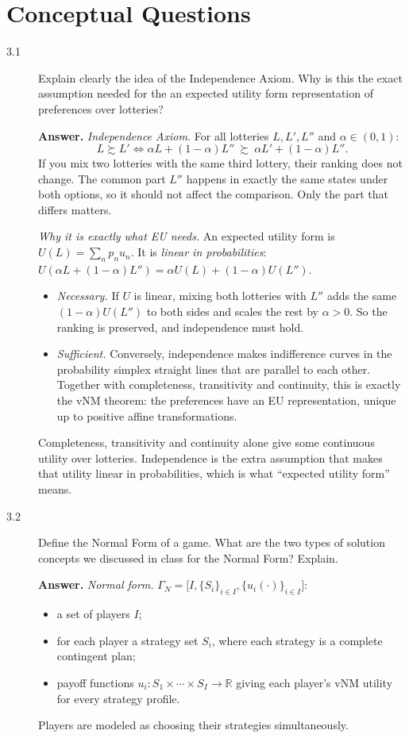 \documentclass[11pt]{article}
\newenvironment{solution}{\par\smallskip\noindent\textbf{Answer.} }{\par\medskip}
\begin{document}
\section{Conceptual Questions}

\begin{description}
\item[3.1] Explain clearly the idea of the Independence Axiom. Why is this the exact assumption needed for the an expected utility form representation of preferences over lotteries?
\begin{solution}
\emph{Independence Axiom.} For all lotteries $L,L',L''$ and $\alpha\in(0,1)$:
\[
L\succsim L' \iff \alpha L+(1-\alpha)L''\ \succsim\ \alpha L'+(1-\alpha)L''.
\]
If you mix two lotteries with the same third lottery, their ranking does not change. The common part $L''$ happens in exactly the same states under both options, so it should not affect the comparison. Only the part that differs matters.

\emph{Why it is exactly what EU needs.} An expected utility form is $U(L)=\sum_n p_n u_n$. It is \emph{linear in probabilities}: $U(\alpha L+(1-\alpha)L'')=\alpha U(L)+(1-\alpha)U(L'')$.
\begin{itemize}[itemsep=0pt]
\item \emph{Necessary.} If $U$ is linear, mixing both lotteries with $L''$ adds the same $(1-\alpha)U(L'')$ to both sides and scales the rest by $\alpha>0$. So the ranking is preserved, and independence must hold.
\item \emph{Sufficient.} Conversely, independence makes indifference curves in the probability simplex straight lines that are parallel to each other. Together with completeness, transitivity and continuity, this is exactly the vNM theorem: the preferences have an EU representation, unique up to positive affine transformations.
\end{itemize}
Completeness, transitivity and continuity alone give some continuous utility over lotteries. Independence is the extra assumption that makes that utility linear in probabilities, which is what ``expected utility form'' means.
\end{solution}

\item[3.2] Define the Normal Form of a game. What are the two types of solution concepts we discussed in class for the Normal Form? Explain.
\begin{solution}
\emph{Normal form.} $\Gamma_N=\big[I,\{S_i\}_{i\in I},\{u_i(\cdot)\}_{i\in I}\big]$:
\begin{itemize}[itemsep=0pt]
\item a set of players $I$;
\item for each player a strategy set $S_i$, where each strategy is a complete contingent plan;
\item payoff functions $u_i:S_1\times\cdots\times S_I\to\mathbb{R}$ giving each player's vNM utility for every strategy profile.
\end{itemize}
Players are modeled as choosing their strategies simultaneously.


\end{solution}
\end{description}
\end{document}
